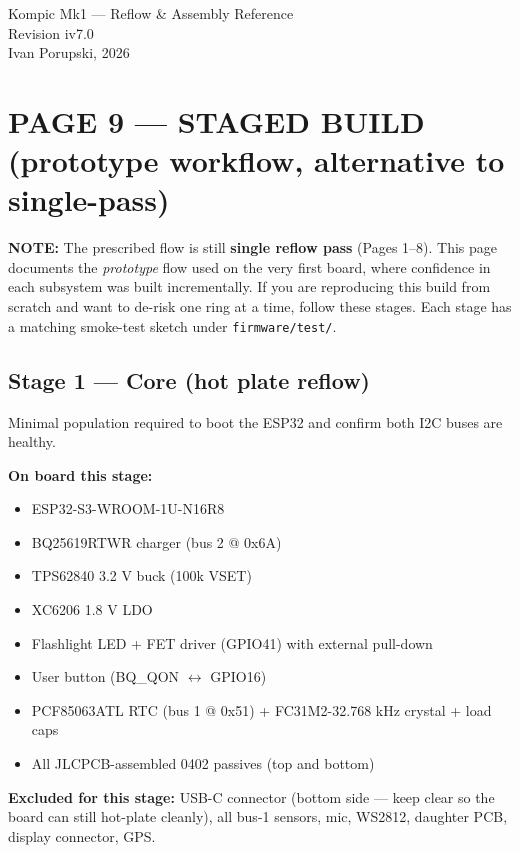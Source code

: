 \documentclass[11pt,a4paper]{article}
\newcommand{\notebox}[1]{\par\noindent\colorbox{headerblue!8}{\parbox{\dimexpr\textwidth-2\fboxsep}{%
\textcolor{headerblue}{\textbf{NOTE:}} #1}}\par\vspace{0.5em}}
\begin{document}
\vfill
\begin{center}\footnotesize
Kompic Mk1 — Reflow \& Assembly Reference \\
Revision iv7.0 \\
Ivan Porupski, 2026
\end{center}

\newpage
\section*{PAGE 9 — STAGED BUILD (prototype workflow, alternative to single-pass)}

\notebox{The prescribed flow is still \textbf{single reflow pass} (Pages 1--8). This page documents the \emph{prototype} flow used on the very first board, where confidence in each subsystem was built incrementally. If you are reproducing this build from scratch and want to de-risk one ring at a time, follow these stages. Each stage has a matching smoke-test sketch under \texttt{firmware/test/}.}

\subsection*{Stage 1 — Core (hot plate reflow)}

Minimal population required to boot the ESP32 and confirm both I2C buses are healthy.

\textbf{On board this stage:}
\begin{itemize}[nosep]
\item ESP32-S3-WROOM-1U-N16R8
\item BQ25619RTWR charger (bus 2 @ 0x6A)
\item TPS62840 3.2 V buck (100k VSET)
\item XC6206 1.8 V LDO
\item Flashlight LED + FET driver (GPIO41) with external pull-down
\item User button (BQ\_QON $\leftrightarrow$ GPIO16)
\item PCF85063ATL RTC (bus 1 @ 0x51) + FC31M2-32.768 kHz crystal + load caps
\item All JLCPCB-assembled 0402 passives (top and bottom)
\end{itemize}

\textbf{Excluded for this stage:} USB-C connector (bottom side — keep clear so the board can still hot-plate cleanly), all bus-1 sensors, mic, WS2812, daughter PCB, display connector, GPS.
\end{document}

